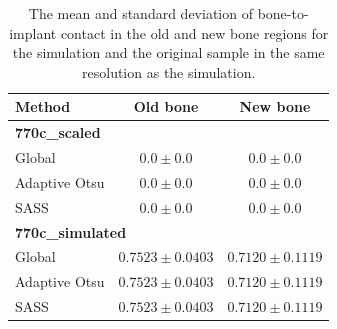 \begin{table}
    \caption{
	    The mean and standard deviation of bone-to-implant contact in the
	    old and new bone regions for the simulation and the original sample
	    in the same resolution as the simulation.
	    }
    \label{tab:bic-sim}
    \centering
    \begin{tabular}{lcc}
        \toprule
        Method & Old bone & New bone \\
        \toprule
	\multicolumn{3}{l}{\textbf{770c\_scaled}} \\
	\midrule
        Global & $0.0 \pm 0.0$ & $0.0 \pm 0.0$ \\
        Adaptive Otsu & $0.0 \pm 0.0$ & $0.0 \pm 0.0$ \\
        SASS & $0.0 \pm 0.0$ & $0.0 \pm 0.0$ \\
	\toprule
	\multicolumn{3}{l}{\textbf{770c\_simulated}} \\
	\midrule
	Global & $0.7523 \pm 0.0403$ & $0.7120 \pm 0.1119$ \\
	Adaptive Otsu & $0.7523 \pm 0.0403$ & $0.7120 \pm 0.1119$ \\
	SASS & $0.7523 \pm 0.0403$ & $0.7120 \pm 0.1119$ \\
        \bottomrule
    \end{tabular}
\end{table}
